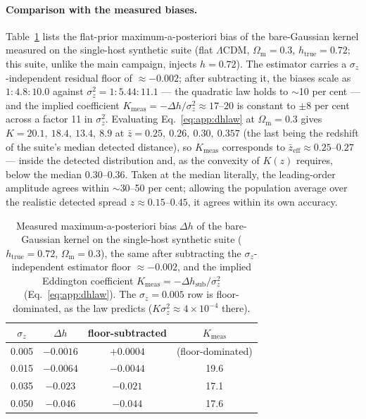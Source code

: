 \paragraph*{Comparison with the measured biases.}
Table~\ref{tab:app:eddz} lists the flat-prior maximum-a-posteriori bias of
the bare-Gaussian kernel measured on the single-host synthetic suite (flat
$\Lambda$CDM, $\Omega_\mathrm{m} = 0.3$, $h_\mathrm{true} = 0.72$; this suite,
unlike the main campaign, injects $h = 0.72$). The estimator carries a
$\sigma_z$-independent residual floor of $\approx -0.002$; after subtracting
it, the biases scale as $1 : 4.8 : 10.0$ against
$\sigma_z^2 = 1 : 5.44 : 11.1$ --- the quadratic law holds to
$\sim$10 per cent --- and the implied coefficient
$K_\mathrm{meas} = -\Delta h/\sigma_z^2 \approx 17$--$20$ is constant to
$\pm 8$ per cent across a factor 11 in $\sigma_z^2$.
Evaluating Eq.~\eqref{eq:app:dhlaw} at $\Omega_\mathrm{m}=0.3$ gives
$K = 20.1,\ 18.4,\ 13.4,\ 8.9$ at $\bar z = 0.25,\ 0.26,\ 0.30,\ 0.357$
(the last being the redshift of the suite's median detected distance), so
$K_\mathrm{meas}$ corresponds to $\bar z_\mathrm{eff} \approx 0.25$--$0.27$ ---
inside the detected distribution and, as the convexity of $K(z)$ requires,
below the median $0.30$--$0.36$. Taken at the median literally, the
leading-order amplitude agrees within $\sim$30--50 per cent; allowing the
population average over the realistic detected spread
$z \approx 0.15$--$0.45$, it agrees within its own accuracy.

\begin{table}
  \centering
  \caption{Measured maximum-a-posteriori bias $\Delta h$ of the bare-Gaussian
  kernel on the single-host synthetic suite ($h_\mathrm{true}=0.72$,
  $\Omega_\mathrm{m}=0.3$), the same after subtracting the
  $\sigma_z$-independent estimator floor $\approx -0.002$, and the implied
  Eddington coefficient $K_\mathrm{meas} = -\Delta h_\mathrm{sub}/\sigma_z^2$
  (Eq.~\ref{eq:app:dhlaw}). The $\sigma_z = 0.005$ row is floor-dominated,
  as the law predicts ($K\sigma_z^2 \approx 4\times10^{-4}$ there).}
  \label{tab:app:eddz}
  \begin{tabular}{cccc}
    \hline
    $\sigma_z$ & $\Delta h$ & floor-subtracted & $K_\mathrm{meas}$ \\
    \hline
    0.005 & $-0.0016$ & $+0.0004$ & (floor-dominated) \\
    0.015 & $-0.0064$ & $-0.0044$ & 19.6 \\
    0.035 & $-0.023$  & $-0.021$  & 17.1 \\
    0.050 & $-0.046$  & $-0.044$  & 17.6 \\
    \hline
  \end{tabular}
\end{table}

